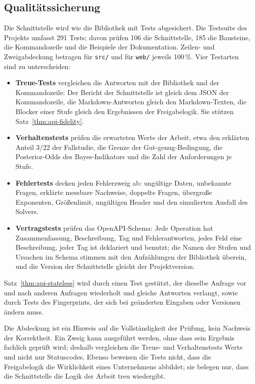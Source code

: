 \documentclass[a4paper,12pt]{article}
\theoremstyle{definition}
\begin{document}
\subsection{Qualitätssicherung}
\label{sec:api-tests}
Die Schnittstelle wird wie die Bibliothek mit Tests abgesichert. Die Testsuite des Projekts umfasst 291 Tests; davon prüfen 106 die Schnittstelle, 185 die Bausteine, die Kommandozeile und die Beispiele der Dokumentation. Zeilen- und Zweigabdeckung betragen für \texttt{src/} und für \texttt{web/} jeweils 100\,\%. Vier Testarten sind zu unterscheiden:
\begin{itemize}
\item \textbf{Treue-Tests} vergleichen die Antworten mit der Bibliothek und der Kommandozeile: Der Bericht der Schnittstelle ist gleich dem JSON der Kommandozeile, die Markdown-Antworten gleich den Markdown-Texten, die Blocker einer Stufe gleich den Ergebnissen der Freigabelogik. Sie stützen Satz~\ref{thm:api-fidelity}.
\item \textbf{Verhaltenstests} prüfen die erwarteten Werte der Arbeit, etwa den erklärten Anteil $3/22$ der Fallstudie, die Grenze der Gut-genug-Bedingung, die Posterior-Odds des Bayes-Indikators und die Zahl der Anforderungen je Stufe.
\item \textbf{Fehlertests} decken jeden Fehlerzweig ab: ungültige Daten, unbekannte Fragen, erklärte messbare Nachweise, doppelte Fragen, übergroße Exponenten, Größenlimit, ungültigen Header und den simulierten Ausfall des Solvers.
\item \textbf{Vertragstests} prüfen das OpenAPI-Schema: Jede Operation hat Zusammenfassung, Beschreibung, Tag und Fehlerantworten, jedes Feld eine Beschreibung, jeder Tag ist deklariert und benutzt; die Namen der Stufen und Ursachen im Schema stimmen mit den Aufzählungen der Bibliothek überein, und die Version der Schnittstelle gleicht der Projektversion.
\end{itemize}
Satz~\ref{thm:api-stateless} wird durch einen Test gestützt, der dieselbe Anfrage vor und nach anderen Anfragen wiederholt und gleiche Antworten verlangt, sowie durch Tests des Fingerprints, der sich bei geänderten Eingaben oder Versionen ändern muss.

Die Abdeckung ist ein Hinweis auf die Vollständigkeit der Prüfung, kein Nachweis der Korrektheit. Ein Zweig kann ausgeführt werden, ohne dass sein Ergebnis fachlich geprüft wird; deshalb vergleichen die Treue- und Verhaltenstests Werte und nicht nur Statuscodes. Ebenso beweisen die Tests nicht, dass die Freigabelogik die Wirklichkeit eines Unternehmens abbildet; sie belegen nur, dass die Schnittstelle die Logik der Arbeit treu wiedergibt.
\end{document}
